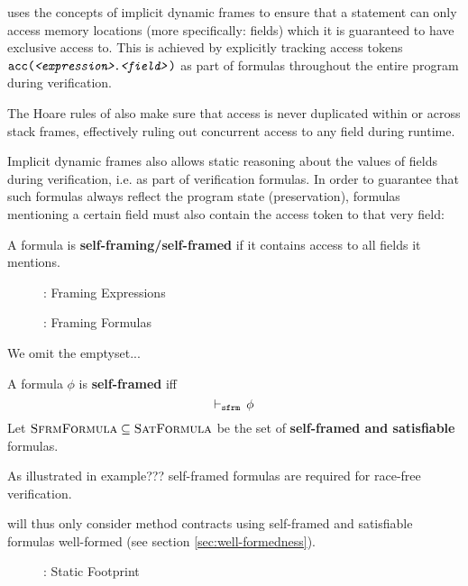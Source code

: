 


\svl uses the concepts of implicit dynamic frames to ensure that a statement can only access memory locations (more specifically: fields) which it is guaranteed to have exclusive access to.
This is achieved by explicitly tracking access tokens $\texttt{acc(\textit{<expression>}.\textit{<field>})}$ as part of formulas throughout the entire program during verification.
    
The Hoare rules of \svl also make sure that access is never duplicated within or across stack frames, effectively ruling out concurrent access to any field during runtime.

Implicit dynamic frames also allows static reasoning about the values of fields during verification, i.e. as part of verification formulas.
In order to guarantee that such formulas always reflect the program state (preservation), formulas mentioning a certain field must also contain the access token to that very field:
\begin{definition}
    A formula is \textbf{self-framing/self-framed} if it contains access to all fields it mentions.
\end{definition}


\begin{figure}
    
    \caption{\svl: Framing Expressions}
\end{figure}

\begin{figure}
    
    \caption{\svl: Framing Formulas}
\end{figure}

We omit the emptyset... 

\begin{definition}
    A formula $\phi$ is \textbf{self-framed} iff
    \begin{displaymath}
    \vdash_\texttt{sfrm}\, \phi
    \end{displaymath}
    Let $\textsc{SfrmFormula} \subseteq \textsc{SatFormula}$ be the set of \textbf{self-framed and satisfiable} formulas.
\end{definition}

As illustrated in example??? self-framed formulas are required for race-free verification.

\svl will thus only consider method contracts using self-framed and satisfiable formulas well-formed (see section \ref{sec:well-formedness}).

\begin{figure}
    
    \caption{\svl: Static Footprint}
\end{figure}

